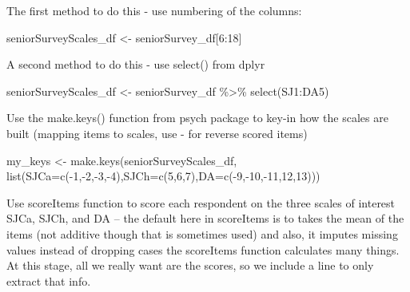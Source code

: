 \documentclass[
]{book}
\newenvironment{Shaded}{\begin{snugshade}}{\end{snugshade}}
\newcommand{\AttributeTok}[1]{\textcolor[rgb]{0.77,0.63,0.00}{#1}}
\newcommand{\DecValTok}[1]{\textcolor[rgb]{0.00,0.00,0.81}{#1}}
\newcommand{\FunctionTok}[1]{\textcolor[rgb]{0.00,0.00,0.00}{#1}}
\newcommand{\NormalTok}[1]{#1}
\newcommand{\OtherTok}[1]{\textcolor[rgb]{0.56,0.35,0.01}{#1}}
\newcommand{\SpecialCharTok}[1]{\textcolor[rgb]{0.00,0.00,0.00}{#1}}
\begin{document}
The first method to do this - use numbering of the columns:

\begin{Shaded}
\begin{Highlighting}[]
\NormalTok{seniorSurveyScales\_df }\OtherTok{\textless{}{-}}\NormalTok{ seniorSurvey\_df[}\DecValTok{6}\SpecialCharTok{:}\DecValTok{18}\NormalTok{]}
\end{Highlighting}
\end{Shaded}

A second method to do this - use select() from dplyr

\begin{Shaded}
\begin{Highlighting}[]
\NormalTok{seniorSurveyScales\_df }\OtherTok{\textless{}{-}}\NormalTok{ seniorSurvey\_df }\SpecialCharTok{\%\textgreater{}\%} \FunctionTok{select}\NormalTok{(SJ1}\SpecialCharTok{:}\NormalTok{DA5)}
\end{Highlighting}
\end{Shaded}

Use the make.keys() function from psych package to key-in how the scales are built (mapping items to scales, use - for reverse scored items)

\begin{Shaded}
\begin{Highlighting}[]
\NormalTok{my\_keys }\OtherTok{\textless{}{-}} \FunctionTok{make.keys}\NormalTok{(seniorSurveyScales\_df, }\FunctionTok{list}\NormalTok{(}\AttributeTok{SJCa=}\FunctionTok{c}\NormalTok{(}\SpecialCharTok{{-}}\DecValTok{1}\NormalTok{,}\SpecialCharTok{{-}}\DecValTok{2}\NormalTok{,}\SpecialCharTok{{-}}\DecValTok{3}\NormalTok{,}\SpecialCharTok{{-}}\DecValTok{4}\NormalTok{),}\AttributeTok{SJCh=}\FunctionTok{c}\NormalTok{(}\DecValTok{5}\NormalTok{,}\DecValTok{6}\NormalTok{,}\DecValTok{7}\NormalTok{),}\AttributeTok{DA=}\FunctionTok{c}\NormalTok{(}\SpecialCharTok{{-}}\DecValTok{9}\NormalTok{,}\SpecialCharTok{{-}}\DecValTok{10}\NormalTok{,}\SpecialCharTok{{-}}\DecValTok{11}\NormalTok{,}\DecValTok{12}\NormalTok{,}\DecValTok{13}\NormalTok{)))}
\end{Highlighting}
\end{Shaded}

Use scoreItems function to score each respondent on the three scales of interest SJCa, SJCh, and DA -- the default here in scoreItems is to takes the mean of the items (not additive though that is sometimes used) and also, it imputes missing values instead of dropping cases the scoreItems function calculates many things. At this stage, all we really want are the scores, so we include a line to only extract that info.
\end{document}
